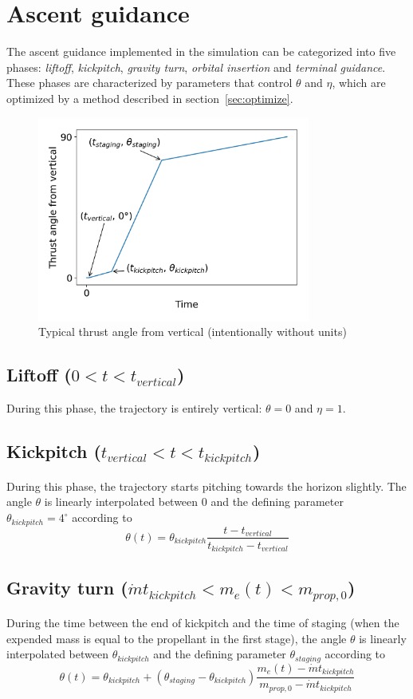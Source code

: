 \documentclass[11pt]{article}
\begin{document}
\section{Ascent guidance}
The ascent guidance implemented in the simulation can be categorized into five phases: 
\textit{liftoff}, 
\textit{kickpitch}, 
\textit{gravity turn}, 
\textit{orbital insertion} and 
\textit{terminal guidance}.
These phases are characterized by parameters that control $\theta$ and $\eta$, which are optimized by a method described in section~\ref{sec:optimize}. 

\begin{figure}[H]
  \centering
  \includegraphics[width=0.8\textwidth]{./plots/angleFromVertical.png}
  \caption{Typical thrust angle from vertical (intentionally without units)}
\end{figure}

\subsection{Liftoff ($0 < t < t_{vertical}$)}
During this phase, the trajectory is entirely vertical: $\theta = 0$ and $\eta = 1$.

\subsection{Kickpitch ($t_{vertical} < t < t_{kickpitch}$)}
During this phase, the trajectory starts pitching towards the horizon slightly.
The angle $\theta$ is linearly interpolated between 0 and the defining parameter $\theta_{kickpitch} = 4^{\circ}$ according to
$$
\theta(t) = \theta_{kickpitch} \frac{t - t_{vertical}}{t_{kickpitch} - t_{vertical}}
$$

\subsection{Gravity turn ($\dot{m} t_{kickpitch} < m_e(t) < m_{prop,0}$)}
During the time between the end of kickpitch and the time of staging (when the expended mass is equal to the propellant in the first stage),
the angle $\theta$ is linearly interpolated between $\theta_{kickpitch}$ and the defining parameter $\theta_{staging}$ according to
$$
\theta(t) = \theta_{kickpitch} + \left( \theta_{staging} - \theta_{kickpitch} \right) \frac{m_e(t) - \dot{m} t_{kickpitch}}{m_{prop,0} - \dot{m} t_{kickpitch}}
$$
\end{document}
